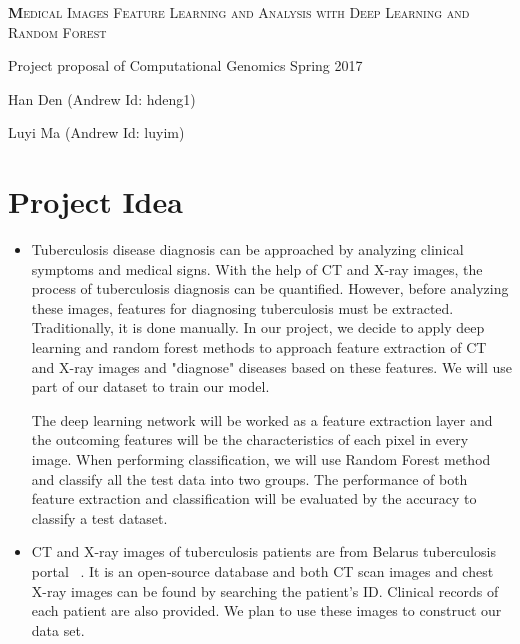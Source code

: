 \documentclass[letterpaper, 11pt]{article}
\begin{document}
\begin{center}
{\Large
	\textsc{\textbf Medical Images Feature Learning and Analysis with Deep Learning and Random Forest}
}

\vspace{0.3cm}

\normalsize Project proposal of Computational Genomics Spring 2017

\vspace{0.5cm}

{\small
	Han Den (Andrew Id: hdeng1)
	
	Luyi Ma (Andrew Id: luyim)
}
\end{center}

\section{Project Idea}

\begin{itemize}
\item
Tuberculosis disease diagnosis can be approached by analyzing clinical symptoms and medical signs. With the help of CT and X-ray images, the process of tuberculosis diagnosis can be quantified. However, before analyzing these images, features for diagnosing tuberculosis must be extracted. Traditionally, it is done manually. In our project, we decide to apply deep learning and random forest methods to approach feature extraction of CT and X-ray images and "diagnose" diseases based on these features. We will use part of our dataset to train our model. 

The deep learning network will be worked as a feature extraction layer and the outcoming features will be the characteristics of each pixel in every image. When performing classification, we will use Random Forest method and classify all the test data into two groups. The performance of both feature extraction and classification will be evaluated by the accuracy to classify a test dataset.

\item 
CT and X-ray images of tuberculosis patients are from Belarus tuberculosis portal
~\cite{TB_database}.
It is an open-source database and both CT scan images and chest X-ray images can be found by searching the patient's ID. Clinical records of each patient are also provided. We plan to use these images to construct our data set.
\end{itemize}

\end{document}
